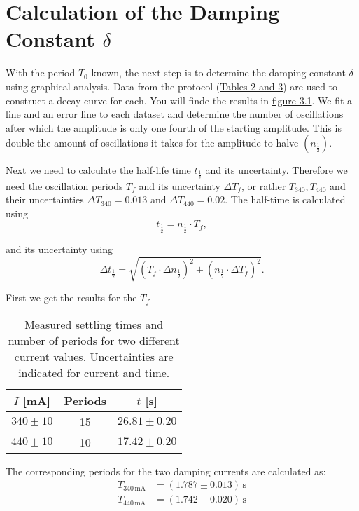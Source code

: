 \section{Calculation of the Damping Constant $\delta$}
With the period $T_0$ known, the next step is to determine the damping constant $\delta$ using graphical analysis. Data from the protocol (\hyperref[tab:settling_times]{Tables 2 and 3}) are used to construct a decay curve for each.
You will finde the results in \hyperref[fig:dumping_on_log]{figure 3.1}.
We fit a line and an error line to each dataset
and determine the number of oscillations after which the amplitude is only one fourth of the starting
amplitude. This is double the amount of oscillations it takes for the amplitude to halve $(n_{\frac{1}{2}})$.

Next we need to calculate the half-life time $t_{\frac{1}{2}}$ and its uncertainty. 
Therefore we need the oscillation periods $T_f$ and its uncertainty $\Delta T_f$, or rather $T_{340}, T_{440}$ and their uncertainties $\Delta T_{340} = 0.013$ and $\Delta T_{440} = 0.02$.
The half-time is calculated using
\begin{equation}
    t_{\frac{1}{2}} = n_{\frac{1}{2}} \cdot T_f,
\end{equation}

and its uncertainty using
\begin{equation}
    \Delta t_{\frac{1}{2}} = \sqrt{(T_f \cdot \Delta n_{\frac{1}{2}})^2 + (n_{\frac{1}{2}} \cdot \Delta T_f)^2}.
\end{equation}

First we get the results for the $T_f$
\begin{table}[h!]
    \centering
    \begin{tabular}{c|c|c}
        \hline
        \textbf{$I$ [mA]} & \textbf{Periods} & \textbf{$t$ [s]} \\
        \hline
        $340 \pm 10$ & 15 & $26.81 \pm 0.20$ \\
        $440 \pm 10$ & 10 & $17.42 \pm 0.20$ \\
        \hline
    \end{tabular}
    \caption{Measured settling times and number of periods for two different current values. Uncertainties are indicated for current and time.}
    \label{tab:settling_times}
\end{table}

The corresponding periods for the two damping currents are calculated as:
\begin{equation}
    \boxed{
        \begin{aligned}
        T_{340\,\mathrm{mA}} &= (1.787 \pm 0.013)\,\mathrm{s} \\
        T_{440\,\mathrm{mA}} &= (1.742 \pm 0.020)\,\mathrm{s}
    \end{aligned}
    }
\end{equation}

